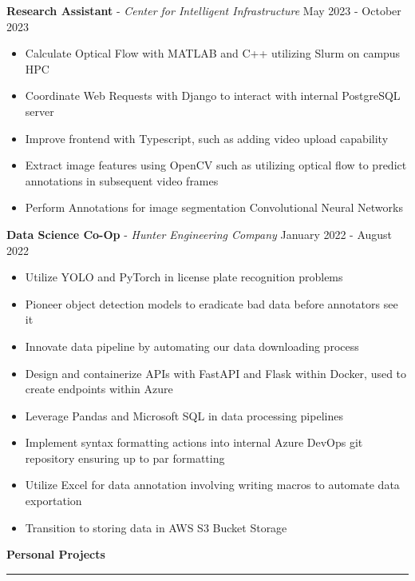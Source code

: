 \documentclass[11pt]{article}
\begin{document}
\textbf{Research Assistant} - \textsl{Center for Intelligent Infrastructure} \hfill May 2023 - October 2023
\begin{itemize}[noitemsep, topsep=0pt, partopsep=0pt, parsep=0pt, itemsep=0pt]
    \small
    \item Calculate Optical Flow with MATLAB and C++ utilizing Slurm on campus HPC
    \item Coordinate Web Requests with Django to interact with internal PostgreSQL server
    \item Improve frontend with Typescript, such as adding video upload capability
    \item Extract image features using OpenCV such as utilizing optical flow to predict annotations in subsequent video frames
    \item Perform Annotations for image segmentation Convolutional Neural Networks
\end{itemize}


\textbf{Data Science Co-Op} - \textsl{Hunter Engineering Company} \hfill January 2022 - August 2022
\begin{itemize}[noitemsep, topsep=0pt, partopsep=0pt, parsep=0pt, itemsep=0pt]
    \small
    \item Utilize YOLO and PyTorch in license plate recognition problems
    \item Pioneer object detection models to eradicate bad data before annotators see it
    \item Innovate data pipeline by automating our data downloading process
    \item Design and containerize APIs with FastAPI and Flask within Docker, used to create endpoints within Azure
    \item Leverage Pandas and Microsoft SQL in data processing pipelines
    \item Implement syntax formatting actions into internal Azure DevOps git repository ensuring up to par formatting
    \item Utilize Excel for data annotation involving writing macros to automate data exportation
    \item Transition to storing data in AWS S3 Bucket Storage
\end{itemize}


\vspace{1pt}  %
\textbf{Personal Projects}\par
\vspace{-12pt}
\noindent\rule{\textwidth}{0.4pt}
\end{document}
